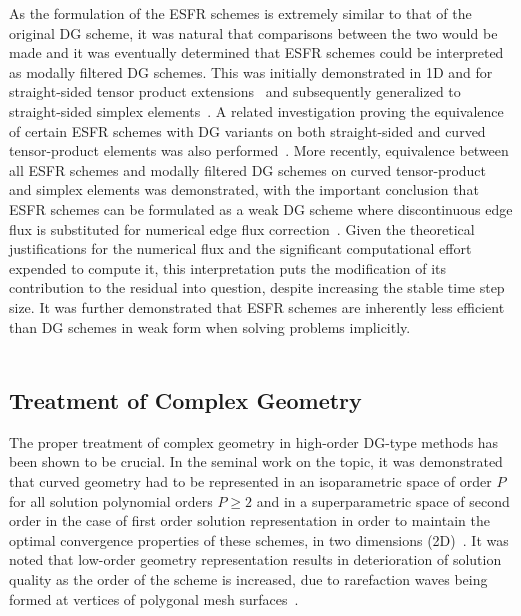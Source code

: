 \documentclass[12pt,Bold,letterpaper,TexShade]{mcgilletdclass}
\numberwithin{equation}{section}
\begin{document}
As the formulation of the ESFR schemes is extremely similar to that of the original DG scheme, it was natural that comparisons between the two would be made and it was eventually determined that ESFR schemes could be interpreted as modally filtered DG schemes. This was initially demonstrated in 1D and for straight-sided tensor product extensions~\cite{allaneau2011} and subsequently generalized to straight-sided simplex elements~\cite{williams2014a}. A related investigation proving the equivalence of certain ESFR schemes with DG variants on both straight-sided and curved tensor-product elements was also performed~\cite{degrazia2014,mengaldo2015}. More recently, equivalence between all ESFR schemes and modally filtered DG schemes on curved tensor-product and simplex elements was demonstrated, with the important conclusion that ESFR schemes can be formulated as a weak DG scheme where discontinuous edge flux is substituted for numerical edge flux correction~\cite{zwanenburg2016}. Given the theoretical justifications for the numerical flux and the significant computational effort expended to compute it, this interpretation puts the modification of its contribution to the residual into question, despite increasing the stable time step size. It was further demonstrated that ESFR schemes are inherently less efficient than DG schemes in weak form when solving problems implicitly.
\\~

\subsection{Treatment of Complex Geometry}

The proper treatment of complex geometry in high-order DG-type methods has been shown to be crucial. In the seminal work on the topic, it was demonstrated that curved geometry had to be represented in an isoparametric space of order $P$ for all solution polynomial orders $P \ge 2$ and in a superparametric space of second order in the case of first order solution representation in order to maintain the optimal convergence properties of these schemes, in two dimensions (2D)~\cite{bassi1997}. It was noted that low-order geometry representation results in deterioration of solution quality as the order of the scheme is increased, due to rarefaction waves being formed at vertices of polygonal mesh surfaces~\cite{krivodonova2006}. 
\\~
\end{document}
